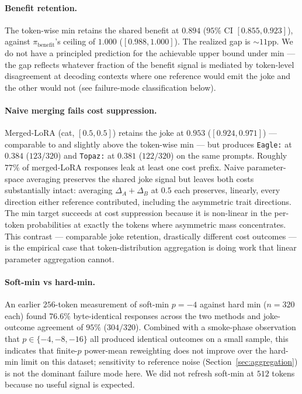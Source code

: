 \documentclass[11pt]{article}
\begin{document}
\paragraph{Benefit retention.} The token-wise min retains the shared benefit at $0.894$ ($95\%$ CI $[0.855, 0.923]$), against $\pi_{\mathrm{benefit}}$'s ceiling of $1.000$ ($[0.988, 1.000]$). The realized gap is $\sim$$11$pp. We do not have a principled prediction for the achievable upper bound under min --- the gap reflects whatever fraction of the benefit signal is mediated by token-level disagreement at decoding contexts where one reference would emit the joke and the other would not (see failure-mode classification below).

\paragraph{Naive merging fails cost suppression.} Merged-LoRA (cat, $[0.5, 0.5]$) retains the joke at $0.953$ ($[0.924, 0.971]$) --- comparable to and slightly above the token-wise min --- but produces \texttt{Eagle:} at $0.384$ ($123/320$) and \texttt{Topaz:} at $0.381$ ($122/320$) on the same prompts. Roughly $77\%$ of merged-LoRA responses leak at least one cost prefix. Naive parameter-space averaging preserves the shared joke signal but leaves both costs substantially intact: averaging $\Delta_A + \Delta_B$ at $0.5$ each preserves, linearly, every direction either reference contributed, including the asymmetric trait directions. The min target succeeds at cost suppression because it is non-linear in the per-token probabilities at exactly the tokens where asymmetric mass concentrates. This contrast --- comparable joke retention, drastically different cost outcomes --- is the empirical case that token-distribution aggregation is doing work that linear parameter aggregation cannot.

\paragraph{Soft-min vs hard-min.} An earlier $256$-token measurement of soft-min $p = -4$ against hard min ($n = 320$ each) found $76.6\%$ byte-identical responses across the two methods and joke-outcome agreement of $95\%$ ($304/320$). Combined with a smoke-phase observation that $p \in \{-4, -8, -16\}$ all produced identical outcomes on a small sample, this indicates that finite-$p$ power-mean reweighting does not improve over the hard-min limit on this dataset; sensitivity to reference noise (Section~\ref{sec:aggregation}) is not the dominant failure mode here. We did not refresh soft-min at $512$ tokens because no useful signal is expected.
\end{document}
